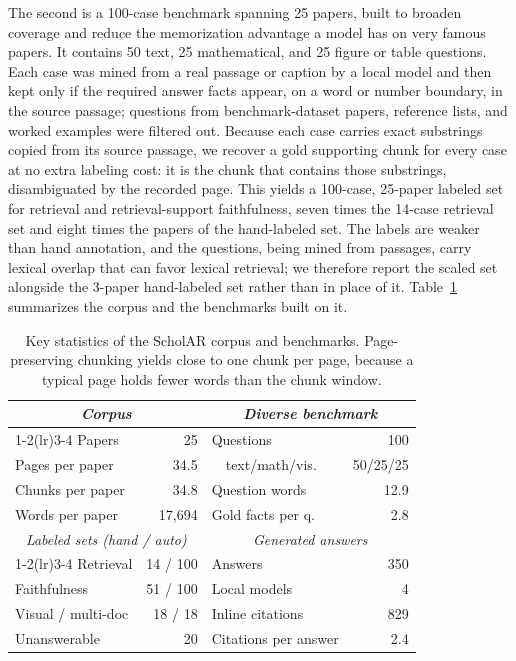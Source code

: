 \documentclass[11pt,letterpaper]{article}
\begin{document}
The second is a 100-case benchmark spanning 25 papers, built to broaden coverage
and reduce the memorization advantage a model has on very famous papers. It contains
50 text, 25 mathematical, and 25 figure or table questions. Each case was mined from
a real passage or caption by a local model and then kept only if the required
answer facts appear, on a word or number boundary, in the source passage; questions
from benchmark-dataset papers, reference lists, and worked examples were filtered
out. Because each case carries exact substrings copied from its source passage, we
recover a gold supporting chunk for every case at no extra labeling cost: it is the
chunk that contains those substrings, disambiguated by the recorded page. This yields
a 100-case, 25-paper labeled set for retrieval and retrieval-support faithfulness, seven times
the 14-case retrieval set and eight times the papers of the hand-labeled set. The
labels are weaker than hand annotation, and the questions, being mined from passages,
carry lexical overlap that can favor lexical retrieval; we therefore report the scaled
set alongside the 3-paper hand-labeled set rather than in place of it.
Table~\ref{tab:benchstats} summarizes the corpus and the benchmarks built on it.

\begin{table}[t]
  \centering
  \caption{Key statistics of the ScholAR corpus and benchmarks. Page-preserving chunking
           yields close to one chunk per page, because a typical page holds fewer words
           than the chunk window.}
  \label{tab:benchstats}
  \small
  \setlength{\tabcolsep}{3pt}
  \begin{tabular}{lr@{\hskip 12pt}lr}
    \toprule
    \multicolumn{2}{c}{\emph{Corpus}} & \multicolumn{2}{c}{\emph{Diverse benchmark}} \\
    \cmidrule(lr){1-2}\cmidrule(lr){3-4}
    Papers            & 25       & Questions           & 100 \\
    Pages per paper   & 34.5     & \ \ text/math/vis.  & 50/25/25 \\
    Chunks per paper  & 34.8     & Question words      & 12.9 \\
    Words per paper   & 17{,}694 & Gold facts per q.   & 2.8 \\
    \midrule
    \multicolumn{2}{c}{\emph{Labeled sets (hand / auto)}} & \multicolumn{2}{c}{\emph{Generated answers}} \\
    \cmidrule(lr){1-2}\cmidrule(lr){3-4}
    Retrieval         & 14 / 100 & Answers             & 350 \\
    Faithfulness      & 51 / 100 & Local models        & 4 \\
    Visual / multi-doc& 18 / 18  & Inline citations    & 829 \\
    Unanswerable      & 20       & Citations per answer & 2.4 \\
    \bottomrule
  \end{tabular}
\end{table}
\end{document}
